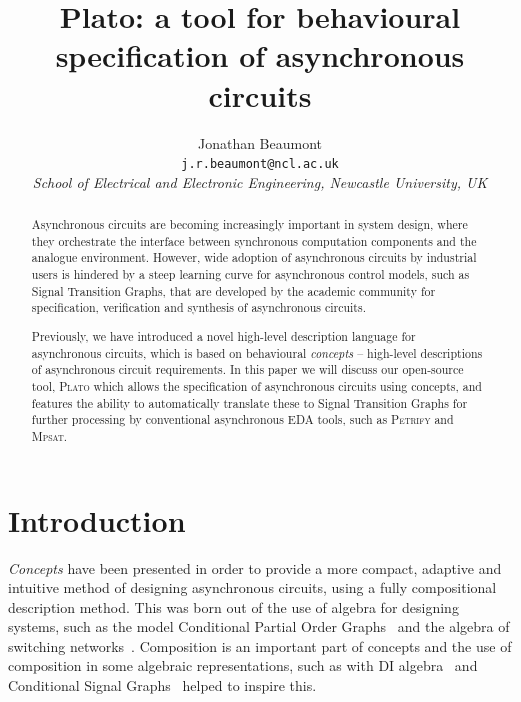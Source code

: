 \documentclass[british,conference,compsoc]{IEEEtran}
\newcommand{\noun}[1]{\textsc{#1}}
\begin{document}
\twocolumn

\title{Plato: a tool for behavioural 
\\ specification of asynchronous circuits}
\author{Jonathan Beaumont\\
\texttt{j.r.beaumont@ncl.ac.uk}\\
\emph{School of Electrical and Electronic Engineering, Newcastle University,
UK}}

\maketitle

\begin{abstract}
Asynchronous circuits are becoming increasingly important in
system design, where they orchestrate
the interface between synchronous computation components
and the analogue environment.
However, wide adoption of asynchronous circuits by industrial users is
hindered by a steep learning curve for asynchronous control models,
such as Signal Transition Graphs, that are developed by the academic
community for specification, verification and synthesis of
asynchronous circuits.

Previously, we have introduced a novel high-level description language
for asynchronous circuits, which is based on behavioural
\textit{concepts} -- high-level descriptions of asynchronous circuit
requirements.
In this paper we will discuss our open-source tool, \noun{Plato} 
which allows the specification of asynchronous circuits using concepts, and 
features the ability to automatically translate these to Signal Transition 
Graphs for further processing by conventional asynchronous EDA 
tools, such as \noun{Petrify} and \noun{Mpsat}.
\end{abstract}

\sloppy
\thispagestyle{empty}

\vspace{-3mm}

\section{Introduction}

\vspace{-3mm}

\emph{Concepts} have been presented in order to provide a more compact, 
adaptive and intuitive method of designing asynchronous circuits, using a fully
compositional description method. This was born out of the use of algebra for 
designing systems, such as the model Conditional Partial Order
Graphs~\cite{CPOG1}\cite{CPOG2}\cite{2014_mokhov_pg} and
the algebra of switching networks~\cite{mokhov2015algebra}. Composition is an 
important part of concepts and the use of composition in some algebraic 
representations, such as with DI algebra~\cite{270632} and Conditional Signal 
Graphs~\cite{6243877} helped to inspire this. 
\end{document}
